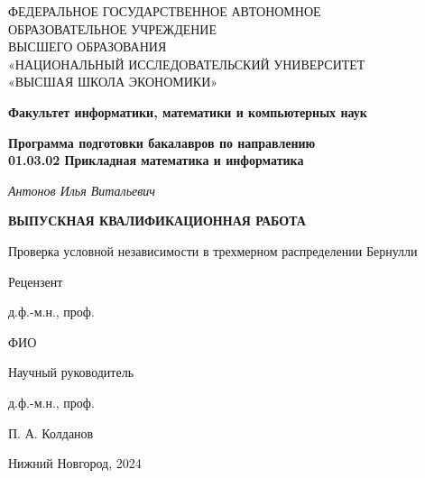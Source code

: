 \thispagestyle{empty}

\begin{center}
    \textsc{
    ФЕДЕРАЛЬНОЕ ГОСУДАРСТВЕННОЕ АВТОНОМНОЕ\\
    ОБРАЗОВАТЕЛЬНОЕ УЧРЕЖДЕНИЕ\\
    ВЫСШЕГО ОБРАЗОВАНИЯ\\
    «НАЦИОНАЛЬНЫЙ ИССЛЕДОВАТЕЛЬСКИЙ УНИВЕРСИТЕТ\\
    «ВЫСШАЯ ШКОЛА ЭКОНОМИКИ»}
\end{center}

\vfill

\begin{center}
    \textbf{Факультет информатики, математики и компьютерных наук}

    \vspace{20pt}

    \textbf{Программа подготовки бакалавров по направлению \\
    01.03.02 Прикладная математика и информатика}
\end{center}

\vfill

\begin{center}
    \textit{Антонов Илья Витальевич} 
    
    \vspace{20pt}
    
    \textbf{ВЫПУСКНАЯ КВАЛИФИКАЦИОННАЯ РАБОТА}

    \vspace{20pt}
    
    Проверка условной независимости в трехмерном распределении Бернулли
\end{center}

\vfill

\begin{minipage}[t]{0.4\textwidth}
    Рецензент 

        \vspace{5pt}
        
    д.ф.-м.н., проф.

    \vspace{5pt}

    ФИО
\end{minipage}
\hfill
\begin{minipage}[t]{0.4\textwidth}
        \begin{flushright}
    Научный руководитель

        \vspace{5pt}
        
    д.ф.-м.н., проф.

        \vspace{5pt}
        
    П. А. Колданов
        \end{flushright}
\end{minipage}

\vfill

\begin{center}
    Нижний Новгород, 2024
\end{center}